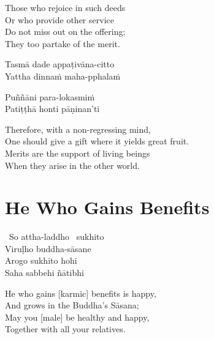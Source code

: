 \ifninebythirteen\clearpage\fi

\begin{english-verses}
  Those who rejoice in such deeds\\
  Or who provide other service\\
  Do not miss out on the offering;\\
  They too partake of the merit.
\end{english-verses}

\ifbfive\clearpage\fi
\ifafive\clearpage\fi

\begin{pali-hang}
  Tasmā dade appaṭivāna-citto\\
  Yattha dinnaṁ maha-pphalaṁ
\end{pali-hang}
\begin{pali-hang-together}
  Puññāni para-lokasmiṁ\\
  Patiṭṭhā honti pāṇinan'ti
\end{pali-hang-together}

\begin{english-verses}
  Therefore, with a non-regressing mind,\\
  One should give a gift where it yields great fruit.\\
  Merits are the support of living beings\\
  When they arise in the other world.
\end{english-verses}

\suttaRef{[AN 5.36]}

\clearpage



\section{He Who Gains Benefits}
\label{he-who-gains-benefits}

\begin{pali-hang-together}
  \anglebracketleft\ \hspace{-0.5mm}So attha-laddho \hspace{-0.5mm}\anglebracketright\ sukhito\\
  Viruḷho buddha-sāsane\\
  Arogo sukhito hohi\\
  Saha sabbehi ñātibhi
\end{pali-hang-together}

\begin{english-verses}
  He who gains [karmic] benefits is happy,\\
  And grows in the Buddha's Sāsana;\\
  May you [male] be healthy and happy,\\
  Together with all your relatives.
\end{english-verses}

